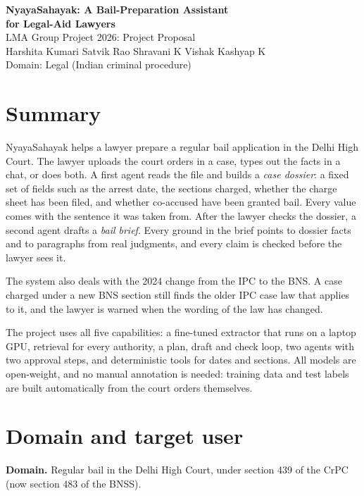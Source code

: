 \documentclass[11pt,a4paper]{article}
\begin{document}
\begin{center}
{\LARGE\bfseries NyayaSahayak: A Bail-Preparation Assistant\\[2pt] for Legal-Aid Lawyers}\\[8pt]
{\large LMA Group Project 2026: Project Proposal}\\[6pt]
Harshita Kumari \quad Satvik Rao \quad Shravani K \quad Vishak Kashyap K\\[2pt]
{\small Domain: Legal (Indian criminal procedure)}
\end{center}

\section{Summary}

NyayaSahayak helps a lawyer prepare a regular bail application in the Delhi High Court. The lawyer uploads the court orders in a case, types out the facts in a chat, or does both. A first agent reads the file and builds a \emph{case dossier}: a fixed set of fields such as the arrest date, the sections charged, whether the charge sheet has been filed, and whether co-accused have been granted bail. Every value comes with the sentence it was taken from. After the lawyer checks the dossier, a second agent drafts a \emph{bail brief}. Every ground in the brief points to dossier facts and to paragraphs from real judgments, and every claim is checked before the lawyer sees it.

The system also deals with the 2024 change from the IPC to the BNS. A case charged under a new BNS section still finds the older IPC case law that applies to it, and the lawyer is warned when the wording of the law has changed.

The project uses all five capabilities: a fine-tuned extractor that runs on a laptop GPU, retrieval for every authority, a plan, draft and check loop, two agents with two approval steps, and deterministic tools for dates and sections. All models are open-weight, and no manual annotation is needed: training data and test labels are built automatically from the court orders themselves.

\section{Domain and target user}

\textbf{Domain.} Regular bail in the Delhi High Court, under section 439 of the CrPC (now section 483 of the BNSS).
\end{document}
